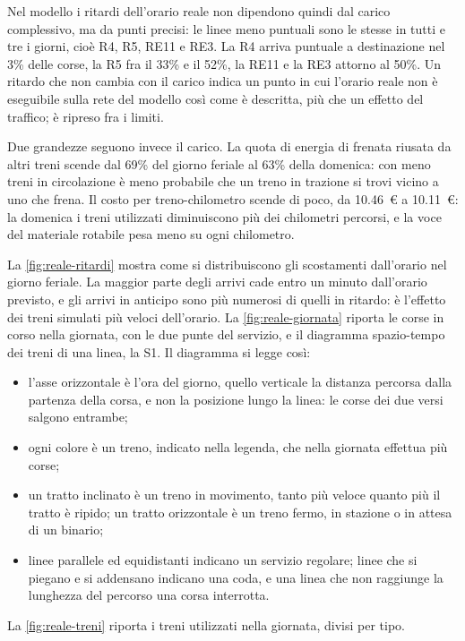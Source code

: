 Nel modello i ritardi dell'orario reale non dipendono quindi dal carico complessivo, ma da punti precisi: le linee meno puntuali sono le stesse in tutti e tre i giorni, cioè R4, R5, RE11 e RE3. La R4 arriva puntuale a destinazione nel 3\% delle corse, la R5 fra il 33\% e il 52\%, la RE11 e la RE3 attorno al 50\%. Un ritardo che non cambia con il carico indica un punto in cui l'orario reale non è eseguibile sulla rete del modello così come è descritta, più che un effetto del traffico; è ripreso fra i limiti.

Due grandezze seguono invece il carico. La quota di energia di frenata riusata da altri treni scende dal 69\% del giorno feriale al 63\% della domenica: con meno treni in circolazione è meno probabile che un treno in trazione si trovi vicino a uno che frena. Il costo per treno-chilometro scende di poco, da \SI{10,46}{\euro} a \SI{10,11}{\euro}: la domenica i treni utilizzati diminuiscono più dei chilometri percorsi, e la voce del materiale rotabile pesa meno su ogni chilometro.

La \cref{fig:reale-ritardi} mostra come si distribuiscono gli scostamenti dall'orario nel giorno feriale. La maggior parte degli arrivi cade entro un minuto dall'orario previsto, e gli arrivi in anticipo sono più numerosi di quelli in ritardo: è l'effetto dei treni simulati più veloci dell'orario. La \cref{fig:reale-giornata} riporta le corse in corso nella giornata, con le due punte del servizio, e il diagramma spazio-tempo dei treni di una linea, la S1. Il diagramma si legge così:
\begin{itemize}
	\item l'asse orizzontale è l'ora del giorno, quello verticale la distanza percorsa dalla partenza della corsa, e non la posizione lungo la linea: le corse dei due versi salgono entrambe;
	\item ogni colore è un treno, indicato nella legenda, che nella giornata effettua più corse;
	\item un tratto inclinato è un treno in movimento, tanto più veloce quanto più il tratto è ripido; un tratto orizzontale è un treno fermo, in stazione o in attesa di un binario;
	\item linee parallele ed equidistanti indicano un servizio regolare; linee che si piegano e si addensano indicano una coda, e una linea che non raggiunge la lunghezza del percorso una corsa interrotta.
\end{itemize}
La \cref{fig:reale-treni} riporta i treni utilizzati nella giornata, divisi per tipo.

